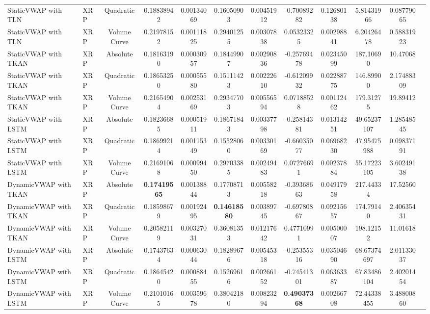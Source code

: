 \begin{table}[H]
{\begin{tabular}{llcccccccccc}
        StaticVWAP with TLN & XRP & Quadratic & 0.18838942 & 0.00134069 & 0.16050903 & 0.00451912 & -0.70089282 & 0.12680138 & 5.81431966 & 0.08779065 \\
        StaticVWAP with TLN & XRP & Volume Curve & 0.21978152 & 0.00111825 & 0.29401255 & 0.00307838 & 0.05323325 & 0.00298841 & 6.20426478 & 0.58831923 \\
        StaticVWAP with TKAN & XRP & Absolute & 0.18163190 & 0.00030957 & 0.18449907 & 0.00290836 & -0.25769478 & 0.02345099 & 187.10690 & 10.47068 \\
        StaticVWAP with TKAN & XRP & Quadratic & 0.18653250 & 0.00055580 & 0.15111423 & 0.00222610 & -0.61209932 & 0.02288775 & 146.89900 & 2.17488309 \\
        StaticVWAP with TKAN & XRP & Volume Curve & 0.21654904 & 0.00253169 & 0.29347703 & 0.00556594 & 0.07188528 & 0.00112462 & 179.31275 & 19.89412 \\
        StaticVWAP with LSTM & XRP & Absolute & 0.18236685 & 0.00051911 & 0.18671843 & 0.00337798 & -0.25814381 & 0.01314251 & 49.65237107 & 1.28548545 \\
        StaticVWAP with LSTM & XRP & Quadratic & 0.18699214 & 0.00115349 & 0.15528060 & 0.00330169 & -0.66035077 & 0.06968230 & 47.95475988 & 0.09837191 \\
        StaticVWAP with LSTM & XRP & Volume Curve & 0.21691068 & 0.00099450 & 0.29703385 & 0.00249483 & 0.07276691 & 0.00237884 & 55.17223105 & 3.60249138 \\
        DynamicVWAP with TKAN & XRP & Absolute & \textbf{0.17419565} & 0.00138844 & 0.17708713 & 0.00558218 & -0.39368663 & 0.04917958 & 217.44334 & 17.52560 \\
        DynamicVWAP with TKAN & XRP & Quadratic & 0.18598679 & 0.00192495 & \textbf{0.14618580} & 0.00389745 & -0.69780867 & 0.09215657 & 174.79140 & 2.40635431 \\
        DynamicVWAP with TKAN & XRP & Volume Curve & 0.20582119 & 0.00327031 & 0.36081353 & 0.01217642 & 0.47710991 & 0.00500007 & 198.12152 & 11.01618 \\
        DynamicVWAP with LSTM & XRP & Absolute & 0.17437634 & 0.00063044 & 0.18289676 & 0.00545318 & -0.25355316 & 0.03504690 & 68.67374697 & 2.01133037 \\
        DynamicVWAP with LSTM & XRP & Quadratic & 0.18645420 & 0.00088455 & 0.15269616 & 0.00266152 & -0.74541301 & 0.06363387 & 67.83486104 & 2.40201454 \\
        DynamicVWAP with LSTM & XRP & Volume Curve & 0.21010165 & 0.00359678 & 0.38042180 & 0.00823294 & \textbf{0.49037368} & 0.00266708 & 72.44338455 & 3.48800860 \\
        \hline
        \end{tabular}
    }
    \label{tab:dynamic_vwap_results}
\end{table}
\clearpage